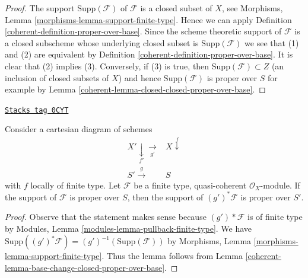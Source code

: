 \begin{proof}

The support $\text{Supp}(\mathcal{F})$ of $\mathcal{F}$ is a closed subset
of $X$, see Morphisms, Lemma \ref{morphisms-lemma-support-finite-type}.
Hence we can apply Definition \ref{coherent-definition-proper-over-base}.
Since the scheme theoretic support of $\mathcal{F}$ is a closed
subscheme whose underlying closed subset is $\text{Supp}(\mathcal{F})$
we see that (1) and (2) are equivalent by
Definition \ref{coherent-definition-proper-over-base}.
It is clear that (2) implies (3).
Conversely, if (3) is true, then
$\text{Supp}(\mathcal{F}) \subset Z$
(an inclusion of closed subsets of $X$)
and hence $\text{Supp}(\mathcal{F})$
is proper over $S$ for example by
Lemma \ref{coherent-lemma-closed-closed-proper-over-base}.
\end{proof}

\begin{lemma}
\label{coherent-lemma-base-change-module-support-proper-over-base}
\href{https://stacks.math.columbia.edu/tag/0CYT}{\texttt{Stacks tag 0CYT}}

Consider a cartesian diagram of schemes
$$
\begin{array}{cc}X' \underset{f'}{\downarrow}\underset{g'}{\longrightarrow} & X \overset{f}{\downarrow} \\ S' \overset{g}{\longrightarrow} & S\end{array}
$$
with $f$ locally of finite type. Let $\mathcal{F}$ be a
finite type, quasi-coherent $\mathcal{O}_X$-module.
If the support of $\mathcal{F}$ is proper over $S$, then
the support of $(g')^*\mathcal{F}$ is proper over $S'$.
\end{lemma}

\begin{proof}

Observe that the statement makes sense because
$(g')*\mathcal{F}$ is of finite type by
Modules, Lemma \ref{modules-lemma-pullback-finite-type}.
We have $\text{Supp}((g')^*\mathcal{F}) = (g')^{-1}(\text{Supp}(\mathcal{F}))$
by Morphisms, Lemma \ref{morphisms-lemma-support-finite-type}.
Thus the lemma follows from
Lemma \ref{coherent-lemma-base-change-closed-proper-over-base}.
\end{proof}


